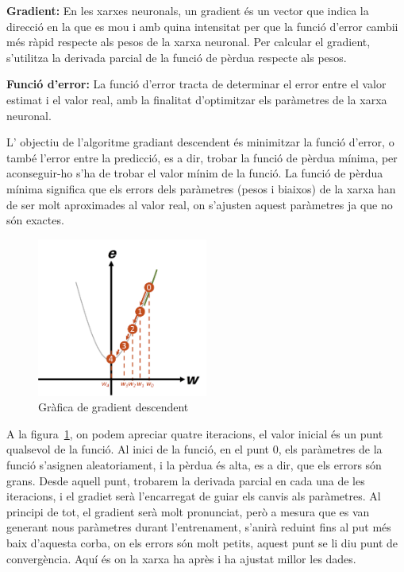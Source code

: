 \begin{enumerate}
\begin{itemize}
         \textbf{Gradient: } En les xarxes neuronals, un gradient és un vector que indica la direcció en la que es mou i amb quina intensitat per que la funció d'error cambii més ràpid respecte als pesos de la xarxa neuronal. Per calcular el gradient, s'utilitza la derivada parcial de la funció de pèrdua respecte als pesos.

        \textbf{Funció d'error: } La funció d'error tracta de determinar el error entre el valor estimat i el valor real, amb la finalitat d'optimitzar els paràmetres de la xarxa neuronal.

         L' objectiu de l'algoritme gradiant descendent és minimitzar la funció d'error, o també l'error entre la predicció, es a dir, trobar la funció de pèrdua mínima, per aconseguir-ho s'ha de trobar el valor mínim de la funció. La funció de pèrdua mínima significa que els errors dels paràmetres (pesos i biaixos) de la xarxa han de ser molt aproximades al valor real, on s'ajusten aquest paràmetres ja que no són exactes.


        \begin{figure}[t]
         \centering
         \includegraphics[width=0.5\textwidth]{./figures/gradient_descendent.png}
        \caption{Gràfica de gradient descendent}
        \label{GraficaDescendet}
         \end{figure}

          A la figura~\ref{GraficaDescendet}, on podem apreciar quatre iteracions, el valor inicial és un punt qualsevol de la funció. Al inici de la funció, en el punt 0, els paràmetres de la funció s'asignen aleatoriament, i la pèrdua és alta, es a dir, que els errors són grans. Desde aquell punt, trobarem la derivada parcial en cada una de les iteracions, i el gradiet serà l'encarregat de guiar els canvis als paràmetres.
          Al principi de tot, el gradient serà molt pronunciat, però a mesura que es van generant nous paràmetres durant l'entrenament, s'anirà reduint fins al put més baix d'aquesta corba, on els errors són molt petits, aquest punt se li diu punt de convergència. Aquí és on la xarxa ha après i ha ajustat millor les dades.


\end{itemize}
\end{enumerate}
